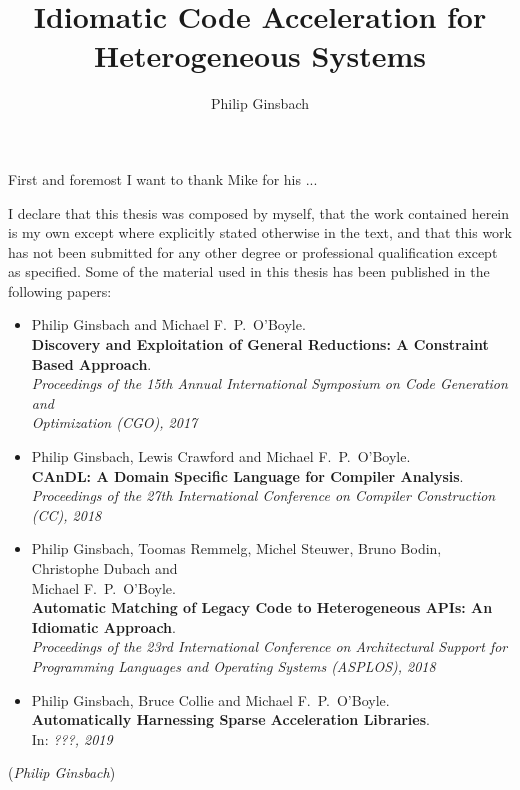 \documentclass[phd,icsa,twoside,logo,11pt]{infthesis}
\title{Idiomatic Code Acceleration for Heterogeneous Systems}
\author{Philip Ginsbach}
\begin{document}
\begin{preliminary}
\maketitle
\begin{acknowledgements}
First and foremost I want to thank Mike for his ...
\end{acknowledgements}
\begin{declaration}
    I declare that this thesis was composed by myself, that the work contained
    herein is my own except where explicitly stated otherwise in the text, and
    that this work has not been submitted for any other degree or professional
    qualification except as specified.
    Some of the material used in this thesis has been published in the following
    papers:

    \begin{itemize}
    \small
        \item Philip Ginsbach and Michael F.\ P.\ O'Boyle.\\
              {\bf Discovery and Exploitation of General Reductions: A
              Constraint Based Approach}.\\
              {\em Proceedings of the 15th Annual International
               Symposium on Code Generation and\\Optimization (CGO), 2017}
        \item Philip Ginsbach, Lewis Crawford and Michael F.\ P.\ O'Boyle.\\
              {\bf CAnDL: A Domain Specific Language for Compiler Analysis}.\\
              {\em Proceedings of the 27th International Conference on
               Compiler Construction (CC), 2018}
        \item Philip Ginsbach, Toomas Remmelg, Michel Steuwer, Bruno Bodin,
              Christophe Dubach and\\Michael F.\ P.\ O'Boyle.\\
              {\bf Automatic Matching of Legacy Code to Heterogeneous APIs: An
              Idiomatic Approach}.\\
              {\em Proceedings of the 23rd International Conference on
               Architectural Support for\\Programming Languages and Operating
               Systems (ASPLOS), 2018}
        \item Philip Ginsbach, Bruce Collie and Michael F.\ P.\ O'Boyle.\\
              {\bf Automatically Harnessing Sparse Acceleration Libraries}.\\
              In: {\em ???, 2019}
    \end{itemize}

    \par
\vspace{1in}\raggedleft({\em Philip Ginsbach})
\end{declaration}
\tableofcontents
\end{preliminary}
\end{document}
